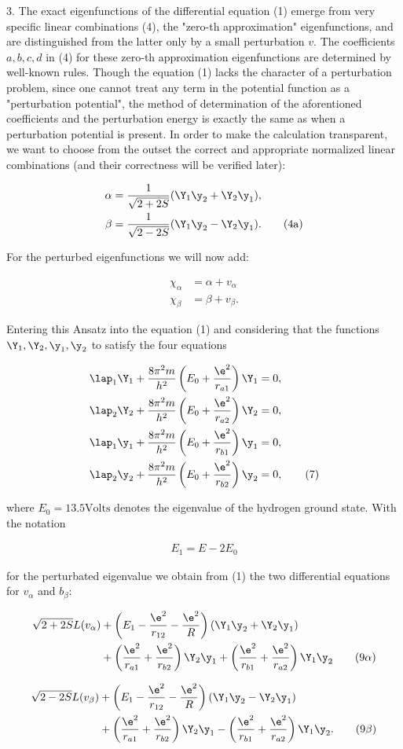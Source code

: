 \documentclass{article}
\newcommand{\nequ}[2]{
\begin{align*}
#1
\tag{#2}
\end{align*}
}
\begin{document}
3. The exact eigenfunctions of the differential equation (1) emerge from very specific linear combinations (4), the "zero-th approximation" eigenfunctions, and are distinguished from the latter only by a small perturbation $v$. The coefficients $a,b,c,d$ in (4) for these zero-th approximation eigenfunctions are determined by well-known rules. Though the equation (1) lacks the character of a perturbation problem, since one cannot treat any term in the potential function as a "perturbation potential", the method of determination of the aforentioned coefficients and the perturbation energy is exactly the same as when a perturbation potential is present. In order to make the calculation transparent, we want to choose from the outset the correct and appropriate normalized linear combinations (and their correctness will be verified later):
\nequ{
\alpha &= \frac{1}{\sqrt{2+2S}}(\Y_1\y_2 + \Y_2\y_1),\\
\beta  &= \frac{1}{\sqrt{2-2S}}(\Y_1\y_2 - \Y_2\y_1).
}{4a}
For the perturbed eigenfunctions we will now add:
\nequ{
\chi_\alpha &= \alpha + v_{\alpha}\\
\chi_\beta  &= \beta +  v_{\beta}.
}{6}
Entering this Ansatz into the equation (1) and considering that the functions $\Y_1, \Y_2, \y_1, \y_2$ to satisfy the four equations
\nequ{
\lap_1 \Y_1 &+ \frac{8\pi^2 m}{h^2}\left( E_0 + \frac{\e^2}{r_{a1}}\right)\Y_1 = 0,\\
\lap_2 \Y_2 &+ \frac{8\pi^2 m}{h^2}\left( E_0 + \frac{\e^2}{r_{a2}}\right)\Y_2 = 0,\\
\lap_1 \y_1 &+ \frac{8\pi^2 m}{h^2}\left( E_0 + \frac{\e^2}{r_{b1}}\right)\y_1 = 0,\\
\lap_2 \y_2 &+ \frac{8\pi^2 m}{h^2}\left( E_0 + \frac{\e^2}{r_{b2}}\right)\y_2 = 0,
}{7}
where $E_0 = 13.5 \text{Volts}$ denotes the eigenvalue of the hydrogen ground state. With the notation
\nequ{
E_1 = E - 2E_0
}{8}
for the perturbated eigenvalue we obtain from (1) the two differential equations for $v_\alpha$ and $b_\beta$:
\nequ{
\sqrt{2+2S}L(v_\alpha) &+ \left(E_1-\frac{\e^2}{r_{12}} - \frac{\e^2}{R}\right)(\Y_1\y_2+\Y_2\y_1)\\
&+ \left(\frac{\e^2}{r_{a1}} + \frac{\e^2}{r_{b2}}\right)\Y_2\y_1 + \left(\frac{\e^2}{r_{b1}} + \frac{\e^2}{r_{a2}}\right)\Y_1\y_2
}{9$\alpha$}
\nequ{
\sqrt{2-2S}L(v_\beta) &+ \left(E_1-\frac{\e^2}{r_{12}} - \frac{\e^2}{R}\right)(\Y_1\y_2-\Y_2\y_1)\\
&+ \left(\frac{\e^2}{r_{a1}} + \frac{\e^2}{r_{b2}}\right)\Y_2\y_1 - \left(\frac{\e^2}{r_{b1}} + \frac{\e^2}{r_{a2}}\right)\Y_1\y_2.
}{9$\beta$}
\end{document}
